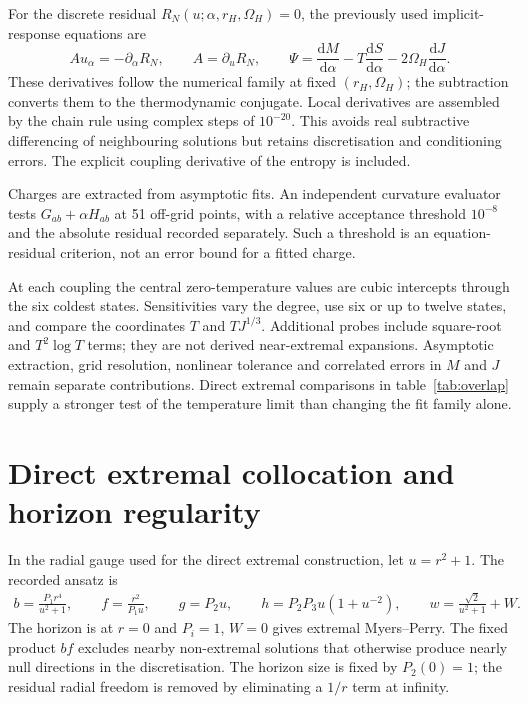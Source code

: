 \documentclass[11pt,a4paper]{article}
\newcommand{\dd}{\mathrm d}
\begin{document}
For the discrete residual $R_N(u;\alpha,r_H,\Omega_H)=0$, the previously used implicit-response equations are
\begin{equation}
 A u_\alpha=-\partial_\alpha R_N,\qquad A=\partial_uR_N,\qquad
 \Psi=\frac{\dd M}{\dd\alpha}-T\frac{\dd S}{\dd\alpha}
                  -2\Omega_H\frac{\dd J}{\dd\alpha}.
 \label{eq:response}
\end{equation}
These derivatives follow the numerical family at fixed $(r_H,\Omega_H)$; the subtraction converts them to the thermodynamic conjugate. Local derivatives are assembled by the chain rule using complex steps of $10^{-20}$. This avoids real subtractive differencing of neighbouring solutions but retains discretisation and conditioning errors. The explicit coupling derivative of the entropy is included.

Charges are extracted from asymptotic fits. An independent curvature evaluator tests $G_{ab}+\alpha H_{ab}$ at 51 off-grid points, with a relative acceptance threshold $10^{-8}$ and the absolute residual recorded separately. Such a threshold is an equation-residual criterion, not an error bound for a fitted charge.

At each coupling the central zero-temperature values are cubic intercepts through the six coldest states. Sensitivities vary the degree, use six or up to twelve states, and compare the coordinates $T$ and $TJ^{1/3}$. Additional probes include square-root and $T^2\log T$ terms; they are not derived near-extremal expansions. Asymptotic extraction, grid resolution, nonlinear tolerance and correlated errors in $M$ and $J$ remain separate contributions. Direct extremal comparisons in table~\ref{tab:overlap} supply a stronger test of the temperature limit than changing the fit family alone.

\section{Direct extremal collocation and horizon regularity}
\label{app:direct}
In the radial gauge used for the direct extremal construction, let $u=r^2+1$. The recorded ansatz is
\begin{gather}
 b=\frac{P_1r^4}{u^2+1},\qquad f=\frac{r^2}{P_1u},\qquad
 g=P_2u,\qquad h=P_2P_3u(1+u^{-2}),\qquad
 w=\frac{\sqrt2}{u^2+1}+W.
\end{gather}
The horizon is at $r=0$ and $P_i=1$, $W=0$ gives extremal Myers--Perry. The fixed product $bf$ excludes nearby non-extremal solutions that otherwise produce nearly null directions in the discretisation. The horizon size is fixed by $P_2(0)=1$; the residual radial freedom is removed by eliminating a $1/r$ term at infinity.
\end{document}
